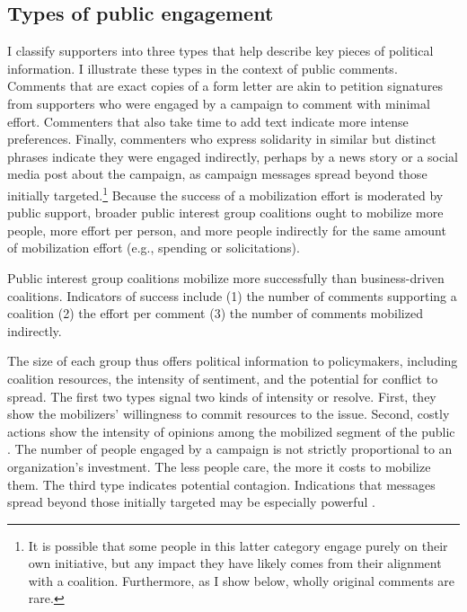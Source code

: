 \documentclass[
      12pt,
        ]{article}
\begin{document}
\hypertarget{types-of-public-engagement}{%
\subsection{Types of public engagement}\label{types-of-public-engagement}}

I classify supporters into three types that help describe key pieces of
political information. I illustrate these types in the context of public
comments. Comments that are exact copies of a form letter are akin to
petition signatures from supporters who were engaged by a campaign to
comment with minimal effort. Commenters that also take time to add text
indicate more intense preferences. Finally, commenters who express
solidarity in similar but distinct phrases indicate they were engaged
indirectly, perhaps by a news story or a social media post about the
campaign, as campaign messages spread beyond those initially
targeted.\footnote{It is possible that some people in this latter category engage
  purely on their own initiative, but any impact they have likely
  comes from their alignment with a coalition. Furthermore, as I show
  below, wholly original comments are rare.} Because the success of a mobilization effort is moderated
by public support, broader public interest group coalitions ought to
mobilize more people, more effort per person, and more people indirectly
for the same amount of mobilization effort (e.g., spending or
solicitations).

Public interest group coalitions mobilize more successfully than
business-driven coalitions. Indicators of success include (1) the number
of comments supporting a coalition (2) the effort per comment (3) the
number of comments mobilized indirectly.

The size of each group thus offers political information to
policymakers, including coalition resources, the intensity of sentiment,
and the potential for conflict to spread. The first two types signal two
kinds of intensity or resolve. First, they show the mobilizers'
willingness to commit resources to the issue. Second, costly actions
show the intensity of opinions among the mobilized segment of the public
\citep{Dunleavy1991}. The number of people engaged by a campaign is not
strictly proportional to an organization's investment. The less people
care, the more it costs to mobilize them. The third type indicates
potential contagion. Indications that messages spread beyond those
initially targeted may be especially powerful \citep{Kollman1998}.
\end{document}
